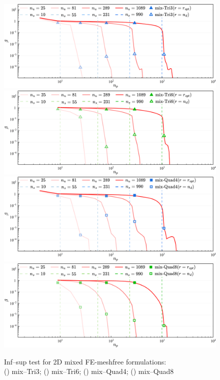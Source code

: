 \begin{figure}[H]
\centering
\begin{subcaptiongroup}
\includegraphics[width=\textwidth]{png/tri3.png}\label{infsup_convergence_2D_a}
\includegraphics[width=\textwidth]{png/tri6.png}\label{infsup_convergence_2D_b}
\includegraphics[width=\textwidth]{png/quad4.png}\label{infsup_convergence_2D_c}
\includegraphics[width=\textwidth]{png/quad8.png}\label{infsup_convergence_2D_d}
\end{subcaptiongroup}
\captionsetup{aboveskip=0pt}
\caption{\centering Inf--sup test for 2D mixed FE-meshfree formulations: \\ () mix--Tri3; () mix--Tri6; () mix--Quad4; () mix--Quad8}
\label{fg:infsup_convergence_2D}
\end{figure}

